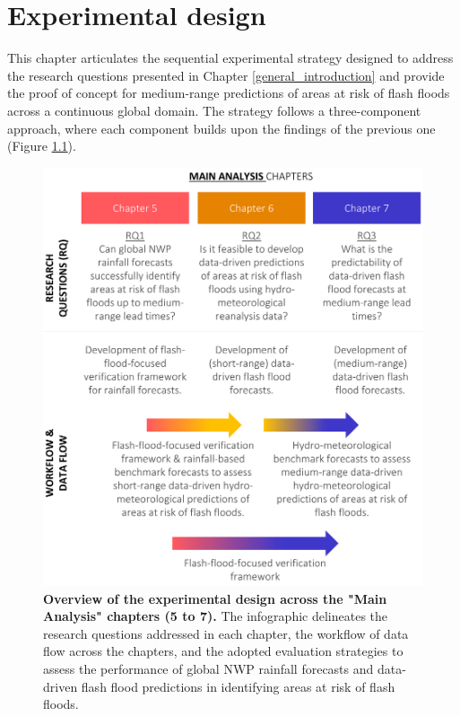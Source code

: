 \chapter{Experimental design}
\label{experimental_design}
\graphicspath{{chapter_03/figures}{chapter_03/tables}}


This chapter articulates the sequential experimental strategy designed to address the research questions presented in Chapter \ref{general_introduction} and provide the proof of concept for medium-range predictions of areas at risk of flash floods across a continuous global domain. The strategy follows a three-component approach, where each component builds upon the findings of the previous one (Figure \ref{fig:workflow_dataflow}). 

\begin{figure}[htbp]
\centering
\includegraphics[width=\textwidth]{workflow_dataflow.png}
\caption{\textbf{Overview of the experimental design across the "Main Analysis" chapters (5 to 7).} The infographic delineates the research questions addressed in each chapter, the workflow of data flow across the chapters, and the adopted evaluation strategies to assess the performance of global NWP rainfall forecasts and data-driven flash flood predictions in identifying areas at risk of flash floods.}
\label{fig:workflow_dataflow}
\end{figure}


